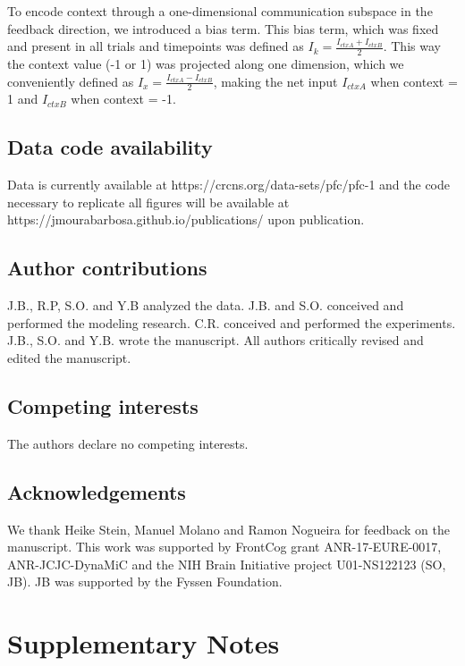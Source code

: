 \documentclass[12pt]{article}
\begin{document}
To encode context through a one-dimensional communication subspace in the feedback direction, we introduced a bias term. This bias term, which was fixed and present in all trials and timepoints was defined as $I_k = \frac{I_{ctxA} + I_{ctxB}}{2}$.  This way the context value (-1 or 1) was projected along one dimension, which we conveniently defined as $I_x = \frac{I_{ctxA} - I_{ctxB}}{2}$, making the net input $I_{ctxA}$ when context = 1 and $I_{ctxB}$ when context = -1.

\subsection*{Data code availability}
Data is currently available at https://crcns.org/data-sets/pfc/pfc-1 and the code necessary to replicate all figures will be available at https://jmourabarbosa.github.io/publications/ upon publication.

\subsection*{Author contributions}
J.B., R.P, S.O. and Y.B analyzed the data. J.B. and S.O. conceived and performed the modeling research. C.R. conceived and performed the experiments. J.B., S.O. and Y.B. wrote the manuscript. All authors critically revised and edited the manuscript. 

\subsection*{Competing interests}
The authors declare no competing interests.

\subsection*{Acknowledgements}
We thank Heike Stein, Manuel Molano and Ramon Nogueira for feedback on the manuscript. This work was supported by FrontCog grant ANR-17-EURE-0017, ANR-JCJC-DynaMiC and the NIH Brain Initiative project U01-NS122123 (SO, JB). JB was supported by the Fyssen Foundation.


\section*{Supplementary Notes}
\end{document}
